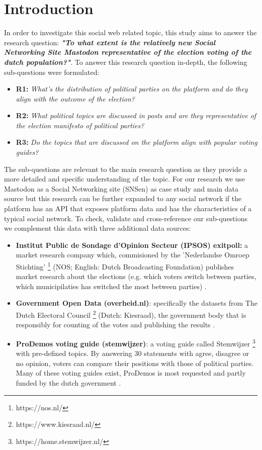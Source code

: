 \section{Introduction}

In order to investigate this social web related topic, this study aims to answer the research question:
\textbf{\textit{"To what extent is the relatively new Social Networking Site Mastodon representative of the election voting of the dutch population?"}}. To answer this research question in-depth, the following sub-questions were formulated:

\begin{itemize}
  \item \textbf{R1:} \textit{What's the distribution of political parties on the platform and do they align with the outcome of the election? }
  \item \textbf{R2:} \textit{What political topics are discussed in posts and are they representative of the election manifesto of political parties? }
  \item \textbf{R3:} \textit{Do the topics that are discussed on the platform align with popular voting guides?}
\end{itemize}

The sub-questions are relevant to the main research question as they provide a more detailed and specific understanding of the topic. For our research we use Mastodon as a Social Networking site (SNSen) as case study and main data source but this research can be further expanded to any social network if the platform has an API that exposes platform data and has the characteristics of a typical social network. To check, validate and cross-reference our sub-questions we complement this data with three additional data sources: 

\begin{itemize}
  \item \textbf{Institut Public de Sondage d'Opinion Secteur (IPSOS) exitpoll:} a market research company which, commisioned by the 'Nederlandse Omroep Stichting' \footnote{https://nos.nl/} (NOS; English: Dutch Broadcasting Foundation) publishes market research about the elections (e.g. which voters switch between parties, which municipilaties has switched the most between parties) \cite{nos}.
  \item \textbf{Government Open Data (overheid.nl)}: specifically the datasets from The Dutch Electoral Council \footnote{https://www.kiesraad.nl/} (Dutch: Kiesraad), the government body that is responsibly for counting of the votes and publishing the results \cite{kiesraad}.
  \item \textbf{ProDemos voting guide (stemwijzer)}: a voting guide called Stemwijzer \footnote{https://home.stemwijzer.nl/} with pre-defined topics. By answering 30 statements with agree, disagree or no opinion, voters can compare their positions with those of political parties. Many of these voting guides exist, ProDemos is most requested and partly funded by the dutch government \cite{prodemos}.
\end{itemize}
